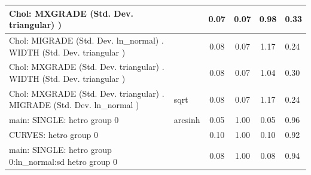 \begin{table}
\begin{center}
\begin{tabular}{|l|l|c|c|c|l|}
			\hline
			 Chol: MXGRADE (Std. Dev. triangular) ) &  & 0.07 & 0.07 & 0.98 & 0.33 \\
			\hline
			 Chol: MIGRADE (Std. Dev. ln_normal) . WIDTH (Std. Dev.   triangular ) &  & 0.08 & 0.07 & 1.17 & 0.24 \\
			\hline
			 Chol: MXGRADE (Std. Dev. triangular) . WIDTH (Std. Dev.   triangular ) &  & 0.08 & 0.07 & 1.04 & 0.30 \\
			\hline
			 Chol: MXGRADE (Std. Dev. triangular) . MIGRADE (Std. Dev.   ln_normal ) & sqrt & 0.08 & 0.07 & 1.17 & 0.24 \\
			\hline
			main: SINGLE: hetro group 0 & arcsinh & 0.05 & 1.00 & 0.05 & 0.96 \\
			\hline
			CURVES: hetro group 0 &  & 0.10 & 1.00 & 0.10 & 0.92 \\
			\hline
			main: SINGLE: hetro group 0:ln_normal:sd  hetro group 0 &  & 0.08 & 1.00 & 0.08 & 0.94 \\
			\hline
		\end{tabular}
	\end{center}
\end{table}
